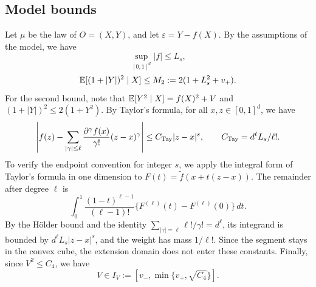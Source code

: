 \subsection*{Model bounds}
Let $\mu$ be the law of $O=(X,Y)$, and let $\varepsilon=Y-f(X)$.
By the assumptions of the model, we have
\begin{equation}\label{eq:U-M0}
 \sup_{[0,1]^d}|f|\le L_s,
\end{equation}
\begin{equation}\label{eq:U-M2}
 \mathbb E[(1+|Y|)^2\mid X]\le M_2:=2(1+L_s^2+v_+).
\end{equation}
For the second bound, note that $\mathbb E[Y^2\mid X]=f(X)^2+V$ and
$(1+|Y|)^2\le2(1+Y^2)$. By Taylor's formula, for all
$x,z\in[0,1]^d$, we have
\begin{equation}\label{eq:U-Tay}
 \left|f(z)-\sum_{|\gamma|\le\ell}
       \frac{\partial^\gamma f(x)}{\gamma!}(z-x)^\gamma\right|
 \le C_{\rm Tay}|z-x|^s,\qquad
 C_{\rm Tay}=d^\ell L_s/\ell!.
\end{equation}
To verify the endpoint convention for integer $s$, we apply the
integral form of Taylor's formula in one dimension to
$F(t)=\widetilde f(x+t(z-x))$. The remainder after degree $\ell$ is
\[
 \int_0^1\frac{(1-t)^{\ell-1}}{(\ell-1)!}
       \{F^{(\ell)}(t)-F^{(\ell)}(0)\}\,dt.
\]
By the H\"older bound and the identity
$\sum_{|\gamma|=\ell}\ell!/\gamma!=d^\ell$, its integrand is bounded
by $d^\ell L_s|z-x|^s$, and the weight has mass $1/\ell!$.
Since the segment stays in the convex cube, the extension domain does
not enter these constants. Finally, since $V^2\le C_4$, we have
\begin{equation}\label{eq:U-setup-IV}
 V\in I_V:=[v_-,\min\{v_+,\sqrt{C_4}\}].
\end{equation}

